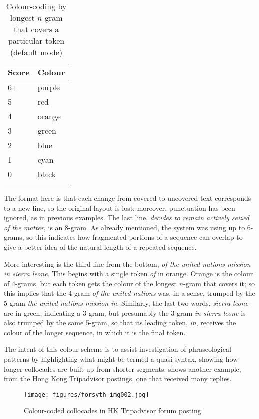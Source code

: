 \documentclass[output=paper]{langscibook}
\begin{document}
\begin{table}
\caption{Colour-coding by longest $n$-gram that covers a particular token (default mode)\label{tab:forsyth:5}}
\begin{tabular}{ll}
\lsptoprule
Score & Colour\\\midrule
6+ & purple\\
5 & red\\
4 & orange\\
3 & green\\
2 & blue\\
1 & cyan\\
0 & black\\
\lspbottomrule
\end{tabular}
\end{table}


The format here is that each change from covered to uncovered text corresponds to a new line, so the original layout is lost; moreover, punctuation has been ignored, as in previous examples. The last line, \textit{decides to remain actively seized of the matter}, is an 8-gram. As already mentioned, the system was using up to 6-grams, so this indicates how fragmented portions of a sequence can overlap to give a better idea of the natural length of a repeated sequence.

More interesting is the third line from the bottom, \textit{of the united nations mission in sierra leone}. This begins with a single token \textit{of} in orange. Orange is the colour of 4-grams, but each token gets the colour of the longest $n$-gram that covers it; so this implies that the 4-gram \textit{of the united nations} was, in a sense, trumped by the 5-gram \textit{the united nations mission in}. Similarly, the last two words, \textit{sierra leone} are in green, indicating a 3-gram, but presumably the 3-gram \textit{in sierra leone} is also trumped by the same 5-gram, so that its leading token, \textit{in}, receives the colour of the longer sequence, in which it is the final token.

The intent of this colour scheme is to assist investigation of phraseological patterns by highlighting what might be termed a quasi-syntax, showing how longer collocades are built up from shorter segments.  shows another example, from the Hong Kong Tripadvisor postings, one that received many replies.

  

\begin{figure}[p]
\texttt{[image: figures/forsyth-img002.jpg]}
\caption{Colour-coded collocades in HK Tripadvisor forum posting}
\label{fig:forsyth:2}
\end{figure}
\end{document}
